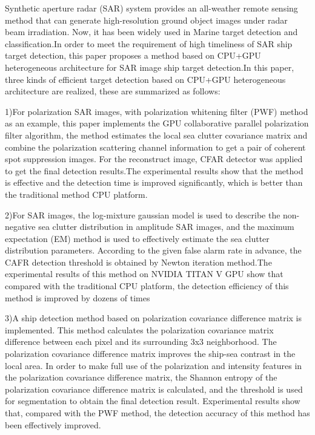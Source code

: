 \begin{eabstract}
  Synthetic aperture radar (SAR) system provides an all-weather remote sensing method 
  that can generate high-resolution ground object images under radar beam irradiation. 
  Now, it has been widely used in Marine target detection and classification.In order 
  to meet the requirement of high timeliness of SAR ship target detection, this paper
  proposes a method based on CPU+GPU heterogeneous architecture for SAR image ship target 
  detection.In this paper, three kinds of efficient target detection based on CPU+GPU heterogeneous
  architecture are realized, these are summarized as follows:

  1)For polarization SAR images, with polarization whitening filter (PWF) method as an example,
  this paper implements the GPU collaborative parallel polarization filter algorithm, the method 
  estimates the local sea clutter covariance matrix and combine the polarization scattering channel information to 
  get a pair of coherent spot suppression images. For the reconstruct image, CFAR detector was applied to get the 
  final detection results.The experimental results show that the method is effective and the detection 
  time is improved significantly, which is better than the traditional method
  CPU platform.

  2)For SAR images, the log-mixture gaussian model is used to describe the non-negative 
  sea clutter distribution in amplitude SAR images, and the maximum expectation (EM) 
  method is used to effectively estimate the sea clutter distribution parameters. 
  According to the given false alarm rate in advance, the CAFR detection threshold is 
  obtained by Newton iteration method.The experimental results of this method on NVIDIA
  TITAN V GPU show that compared with the traditional CPU platform, the detection
  efficiency of this method is improved by dozens of times

 3)A ship detection method based on polarization covariance difference matrix is implemented.  This method calculates the polarization covariance matrix 
  difference between each pixel and its surrounding 3x3 neighborhood. The polarization covariance difference matrix improves
  the ship-sea contrast in the local area.  In order to make full use of the polarization and intensity features 
  in the polarization covariance difference matrix, the Shannon entropy of the polarization covariance
  difference matrix is ​​calculated, and the threshold is used for segmentation to obtain the final detection result.  
  Experimental results show that, compared with the PWF method, the detection accuracy of this method has been effectively improved.

 
\end{eabstract}

